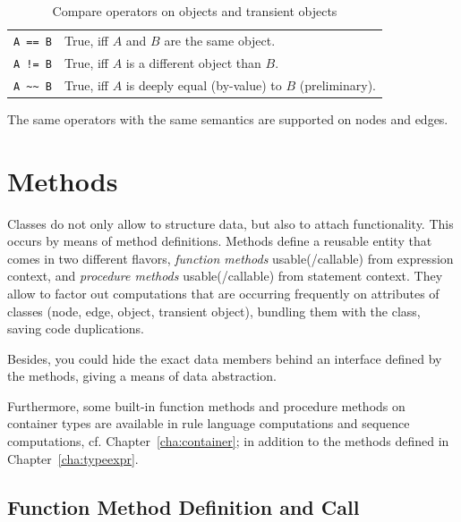 \begin{table}[htbp]
  \centering
  \begin{tabularx}{\linewidth}{|l|X|}
    \hline
    \texttt{A == B} & True, iff $A$ and $B$ are the same object. \\
    \texttt{A != B} & True, iff $A$ is a different object than $B$. \\
    \texttt{A \textasciitilde\textasciitilde\ B} & True, iff $A$ is deeply equal (by-value) to $B$ (preliminary). \\
    \hline
  \end{tabularx}
  \caption{Compare operators on objects and transient objects}
  \label{compandarithmetic}
\end{table}

The same operators with the same semantics are supported on nodes and edges.


\section{Methods}\label{sec:objectoriented}

Classes do not only allow to structure data, but also to attach functionality.
This occurs by means of method definitions.
Methods define a reusable entity that comes in two different flavors, \emph{function methods} usable(/callable) from expression context, and \emph{procedure methods} usable(/callable) from statement context.
They allow to factor out computations that are occurring frequently on attributes of classes (node, edge, object, transient object), bundling them with the class, saving code duplications. 

Besides, you could hide the exact data members behind an interface defined by the methods, giving a means of data abstraction.

Furthermore, some built-in function methods and procedure methods on container types are available in rule language computations and sequence computations, cf. Chapter~\ref{cha:container};
in addition to the methods defined in Chapter~\ref{cha:typeexpr}.

\subsection{Function Method Definition and Call}\label{sub:functionmethods}\label{sub:funcmethcall} 

